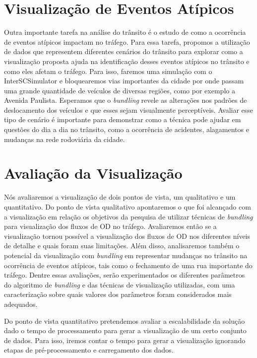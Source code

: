 \section{Visualização de Eventos Atípicos}

  Outra importante tarefa na análise do trânsito é o estudo de como a
ocorrência de eventos atípicos impactam no tráfego. Para essa tarefa, propomos
a utilização de dados que representem diferentes cenários do trânsito para
explorar como a visualização proposta ajuda na identificação desses eventos
atípicos no trânsito e como eles afetam o tráfego. Para isso, faremos uma
simulação com o InterSCSimulator e bloquearemos vias importantes da cidade por
onde passam uma grande quantidade de veículos de diversas regiões, como por
exemplo a Avenida Paulista. Esperamos que o \emph{bundling} revele as alterações nos
padrões de deslocamento dos veículos e que esses sejam visualmente
perceptíveis. Avaliar esse tipo de cenário é importante para demonstrar como a
técnica pode ajudar em questões do dia a dia no trânsito, como a ocorrência de
acidentes, alagamentos e mudanças na rede rodoviária da cidade.

\section{Avaliação da Visualização}
  Nós avaliaremos a visualização de dois pontos de vista, um qualitativo e um
quantitativo. Do ponto de vista qualitativo apontaremos o que foi alcançado com
a visualização em relação os objetivos da pesquisa de utilizar técnicas de \emph{bundling}
para visualização dos fluxos de OD no tráfego. Avaliaremos então se a visualização
tornou possível a visualização dos fluxos de OD nos diferentes níveis de
detalhe e quais foram suas limitações. Além disso, analisaremos também o potencial da
visualização com \emph{bundling} em representar mudanças no trânsito na
ocorrência de eventos atípicos, tais como o fechamento de uma rua importante do
tráfego. Dentre essas avaliações, serão experimentados os diferentes parâmetros
do algoritmo de \emph{bundling} e das técnicas de visualização utilizadas, com
uma caracterização sobre quais valores dos parâmetros foram considerados mais adequados.

  Do ponto de vista quantitativo pretendemos avaliar a escalabilidade da
solução dado o tempo de processamento para gerar a visualização de um certo
conjunto de dados. Para isso, iremos contar o tempo para gerar a visualização
ignorando etapas de pré-processamento e carregamento dos dados.


